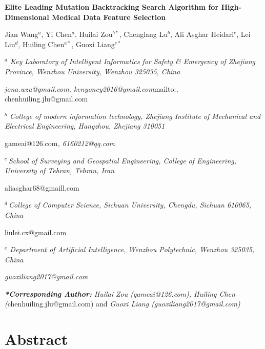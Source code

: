 \documentclass{article} %
\begin{document}


\noindent \textbf{Elite Leading Mutation Backtracking Search Algorithm for High-Dimensional Medical Data Feature Selection }

\noindent Jian Wang${}^{a}$, Yi Chen${}^{a}$, Huilai Zou${}^{b*}$, Chenglang Lu${}^{b}$, Ali Asghar Heidari${}^{c}$, Lei Liu${}^{d}$, Huiling Chen${}^{a*}$, Guoxi Liang${}^{e*}$


\noindent \textit{${}^{a}$ Key Laboratory of Intelligent Informatics for Safety \& Emergency of Zhejiang Province, Wenzhou University, Wenzhou 325035, China}

\noindent \textit{jona.wzu@gmail.com, kenyoncy2016@gmail.com}mailto:\textit{, }chenhuiling.jlu@gmail.com\textit{\underbar{}}

\noindent \textit{${}^{b}$ College of modern information technology, Zhejiang Institute of Mechanical and Electrical Engineering, Hangzhou, Zhejiang 310051}

\noindent gameai@126.com\textit{, 6160212@qq.com}

\noindent \textit{${}^{c}$${}^{\ }$School of Surveying and Geospatial Engineering, College of Engineering, University of Tehran, Tehran, Iran}

\noindent aliasghar68@gmaill.com\textit{\underbar{}}

\textit{${}^{d\ }$College of Computer Science, Sichuan University, Chengdu, Sichuan 610065, China}

liulei.cx@gmail.com\textit{}

\noindent \textit{${}^{e}$ Department of Artificial Intelligence, Wenzhou Polytechnic, Wenzhou 325035, China}

\noindent \textit{guoxiliang2017@gmail.com}

\noindent \textit{}

\noindent \textbf{\textit{*Corresponding Author: }}\textit{Huilai Zou (gameai@126.com), Huiling Chen (}chenhuiling.jlu@gmail.com) and\textit{ Guoxi Liang (guoxiliang2017@gmail.com)}

\noindent 
\section{Abstract}
\end{document}
